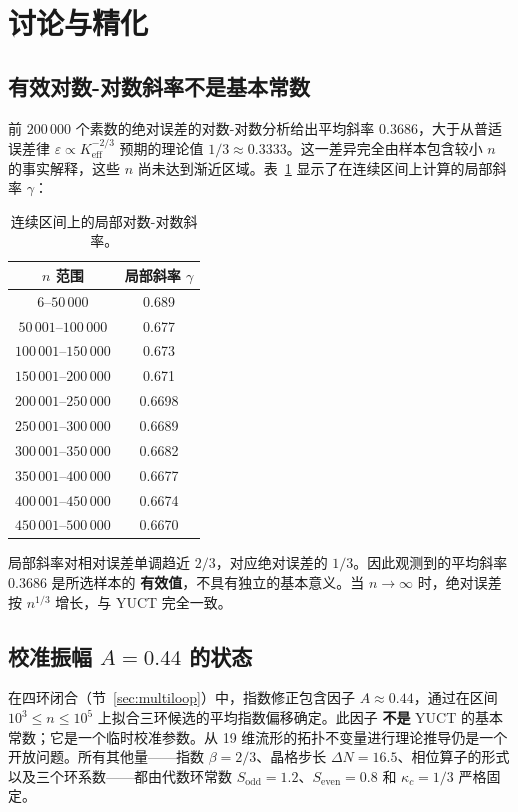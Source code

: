\documentclass[11pt,a4paper]{article}
\begin{document}
	\section{讨论与精化}
	\label{sec:discussion}
	
	\subsection{有效对数-对数斜率不是基本常数}
	前 \(200\,000\) 个素数的绝对误差的对数-对数分析给出平均斜率 \(0.3686\)，大于从普适误差律 \(\varepsilon \propto K_{\mathrm{eff}}^{-2/3}\) 预期的理论值 \(1/3 \approx 0.3333\)。这一差异完全由样本包含较小 \(n\) 的事实解释，这些 \(n\) 尚未达到渐近区域。表~\ref{tab:local-slopes} 显示了在连续区间上计算的局部斜率 \(\gamma\)：
	\begin{table}[htbp]
		\centering
		\caption{连续区间上的局部对数-对数斜率。}
		\label{tab:local-slopes}
		\begin{tabular}{c c}
			\toprule
			\(n\) 范围 & 局部斜率 \(\gamma\) \\
			\midrule
			\(6\)--\(50\,000\)    & 0.689 \\
			\(50\,001\)--\(100\,000\) & 0.677 \\
			\(100\,001\)--\(150\,000\)& 0.673 \\
			\(150\,001\)--\(200\,000\)& 0.671 \\
			\(200\,001\)--\(250\,000\)& 0.6698 \\
			\(250\,001\)--\(300\,000\)& 0.6689 \\
			\(300\,001\)--\(350\,000\)& 0.6682 \\
			\(350\,001\)--\(400\,000\)& 0.6677 \\
			\(400\,001\)--\(450\,000\)& 0.6674 \\
			\(450\,001\)--\(500\,000\)& 0.6670 \\
			\bottomrule
		\end{tabular}
	\end{table}
	局部斜率对相对误差单调趋近 \(2/3\)，对应绝对误差的 \(1/3\)。因此观测到的平均斜率 \(0.3686\) 是所选样本的 \textbf{有效值}，不具有独立的基本意义。当 \(n\to\infty\) 时，绝对误差按 \(n^{1/3}\) 增长，与 YUCT 完全一致。
	
	\subsection{校准振幅 \(A=0.44\) 的状态}
	在四环闭合（节~\ref{sec:multiloop}）中，指数修正包含因子 \(A \approx 0.44\)，通过在区间 \(10^3\le n\le 10^5\) 上拟合三环候选的平均指数偏移确定。此因子 \textbf{不是} YUCT 的基本常数；它是一个临时校准参数。从 19 维流形的拓扑不变量进行理论推导仍是一个开放问题。所有其他量——指数 \(\beta=2/3\)、晶格步长 \(\Delta N=16.5\)、相位算子的形式以及三个环系数——都由代数环常数 \(S_{\mathrm{odd}}=1.2\)、\(S_{\mathrm{even}}=0.8\) 和 \(\kappa_c=1/3\) 严格固定。
	
\end{document}
